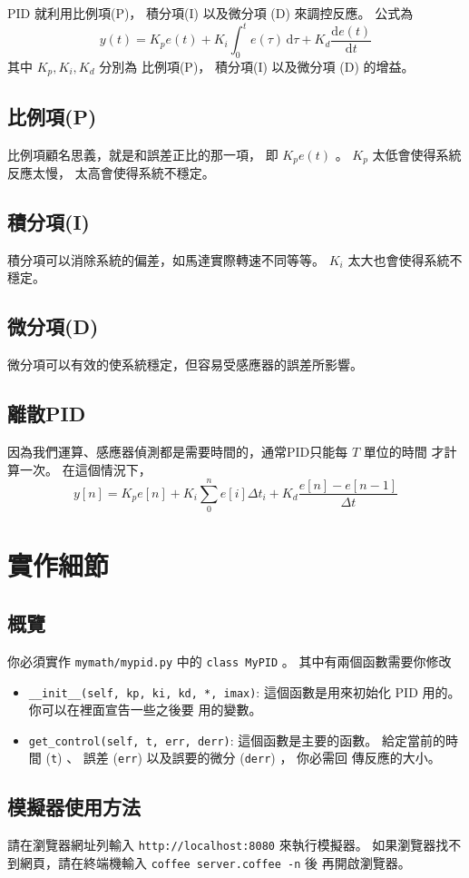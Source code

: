 \documentclass[12pt, a4paper]{article}
\newcommand{\dD}{\mathrm{d}}
\newcommand{\dI}{\,\mathrm{d}}
\begin{document}
PID 就利用比例項(P)， 積分項(I) 以及微分項 (D) 來調控反應。
公式為
\[ y(t) = K_p e(t) + K_i \int_{0}^{t} e(\tau) \dI \tau + K_d \frac{\dD e(t)}{\dD t}\]
其中 $K_p, K_i, K_d$ 分別為 比例項(P)， 積分項(I) 以及微分項 (D) 的增益。
\subsection{比例項(P)}
比例項顧名思義，就是和誤差正比的那一項， 即 $K_p e(t)$ 。
$K_p$ 太低會使得系統反應太慢， 太高會使得系統不穩定。
\subsection{積分項(I)}
積分項可以消除系統的偏差，如馬達實際轉速不同等等。
$K_i$ 太大也會使得系統不穩定。
\subsection{微分項(D)}
微分項可以有效的使系統穩定，但容易受感應器的誤差所影響。

\subsection{離散PID}
因為我們運算、感應器偵測都是需要時間的，通常PID只能每 $T$ 單位的時間
才計算一次。 在這個情況下，
\[ y[n] = K_p e[n] + K_i \sum_0^{n} e[i] \Delta t_i+ K_d \frac{e[n] - e[n-1]}{\Delta t} \]

\section{實作細節}
\subsection{概覽}
你必須實作 \texttt{mymath/mypid.py} 中的 \texttt{class MyPID} 。 
其中有兩個函數需要你修改 
\begin{itemize}
  \item \texttt{__init__(self, kp, ki, kd, *, imax)}:
    這個函數是用來初始化 PID 用的。 你可以在裡面宣告一些之後要
    用的變數。

  \item \texttt{get_control(self, t, err, derr)}:
    這個函數是主要的函數。 給定當前的時間 (\texttt{t}) 、 誤差
    (\texttt{err}) 以及誤要的微分 (\texttt{derr}) ， 你必需回
    傳反應的大小。
\end{itemize}

\subsection{模擬器使用方法}
請在瀏覽器網址列輸入 \texttt{http://localhost:8080} 來執行模擬器。
如果瀏覽器找不到網頁，請在終端機輸入 \texttt{coffee server.coffee -n} 後
再開啟瀏覽器。
\end{document}
